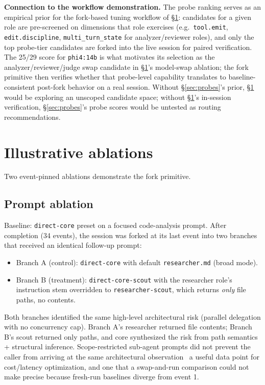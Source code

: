 \documentclass[11pt,a4paper]{article}
\begin{document}
\textbf{Connection to the workflow demonstration.} The probe
ranking serves as an empirical prior for the fork-based tuning
workflow of \S\ref{sec:ablations}: candidates for a given role
are pre-screened on dimensions that role exercises (e.g.\
\texttt{tool.emit}, \texttt{edit.discipline}, \texttt{multi\_turn\_state}
for analyzer/reviewer roles), and only the top probe-tier
candidates are forked into the live session for paired
verification. The 25/29 score for \texttt{phi4:14b} is what
motivates its selection as the analyzer/reviewer/judge swap
candidate in \S\ref{sec:ablations}'s model-swap ablation; the
fork primitive then verifies whether that probe-level capability
translates to baseline-consistent post-fork behavior on a real
session. Without §\ref{sec:probes}'s prior, \S\ref{sec:ablations}
would be exploring an unscoped candidate space; without
\S\ref{sec:ablations}'s in-session verification, \S\ref{sec:probes}'s
probe scores would be untested as routing recommendations.

\section{Illustrative ablations}
\label{sec:ablations}

Two event-pinned ablations demonstrate the fork primitive.

\subsection{Prompt ablation}

Baseline: \texttt{direct-core} preset on a focused
code-analysis prompt. After completion (34 events), the session
was forked at its last event into two branches that received an
identical follow-up prompt:

\begin{itemize}[leftmargin=*,itemsep=2pt,topsep=2pt]
\item Branch A (control): \texttt{direct-core} with default
      \texttt{researcher.md} (broad mode).
\item Branch B (treatment): \texttt{direct-core-scout} with the
      researcher role's instruction stem overridden to
      \texttt{researcher-scout}, which returns \emph{only} file
      paths, no contents.
\end{itemize}

Both branches identified the same high-level architectural risk
(parallel delegation with no concurrency cap). Branch A's
researcher returned file contents; Branch B's scout returned
only paths, and core synthesized the risk from path semantics +
structural inference. Scope-restricted sub-agent prompts did not
prevent the caller from arriving at the same architectural
observation \textemdash\ a useful data point for cost/latency
optimization, and one that a swap-and-run comparison could not
make precise because fresh-run baselines diverge from event 1.
\end{document}
